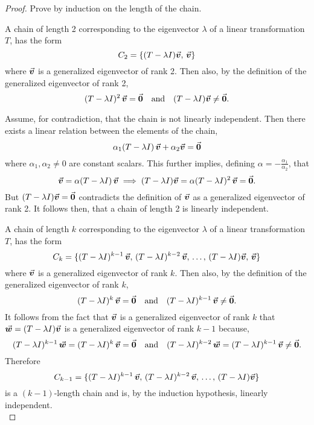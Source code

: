 \documentclass[../MathsNotesBase.tex]{subfiles}
\begin{document}
{		\biggerskip
		\begin{proof}
			Prove by induction on the length of the chain. 
			
			A chain of length 2 corresponding to the eigenvector $\lambda$ of a linear transformation $T$, has the form
			\[ C_2 = \{ (T - \lambda I) \vec{\bm{v}}, \, \vec{\bm{v}} \} \]
			where $\vec{\bm{v}}$ is a generalized eigenvector of rank 2. Then also, by the definition of the generalized eigenvector of rank 2,
			\[ (T - \lambda I)^2 \, \vec{\bm{v}} = \vec{\bm{0}} \hspace{10pt}\text{and}\hspace{10pt} (T - \lambda I) \vec{\bm{v}} \neq \vec{\bm{0}}. \]
			
			Assume, for contradiction, that the chain is not linearly independent. Then there exists a linear relation between the elements of the chain,
			\[ \alpha_1 (T - \lambda I) \, \vec{\bm{v}} + \alpha_2 \vec{\bm{v}} = \vec{\bm{0}} \]
			where ${ \alpha_1, \alpha_2 \neq 0 }$ are constant scalars. This further implies, defining ${ \alpha = -\frac{\alpha_1}{\alpha_2} }$, that
			\[ \vec{\bm{v}} = \alpha (T - \lambda I) \, \vec{\bm{v}} \implies (T - \lambda I) \vec{\bm{v}} = \alpha (T - \lambda I)^2 \, \vec{\bm{v}} = \vec{\bm{0}}. \]
			But ${ (T - \lambda I) \vec{\bm{v}} = \vec{\bm{0}} }$ contradicts the definition of $\vec{\bm{v}}$ as a generalized eigenvector of rank 2. It follows then, that a chain of length 2 is linearly independent.
			
			A chain of length $k$ corresponding to the eigenvector $\lambda$ of a linear transformation $T$, has the form
			\[ C_k = \{ (T - \lambda I)^{k-1} \, \vec{\bm{v}}, \, (T - \lambda I)^{k-2} \, \vec{\bm{v}}, \, \dots, \, (T - \lambda I) \vec{\bm{v}}, \, \vec{\bm{v}} \} \]
			where $\vec{\bm{v}}$ is a generalized eigenvector of rank $k$. Then also, by the definition of the generalized eigenvector of rank $k$,
			\[ (T - \lambda I)^k \, \vec{\bm{v}} = \vec{\bm{0}} \hspace{10pt}\text{and}\hspace{10pt} (T - \lambda I)^{k-1} \, \vec{\bm{v}} \neq \vec{\bm{0}}. \]
			It follows from the fact that $\vec{\bm{v}}$ is a generalized eigenvector of rank $k$ that ${ \vec{\bm{w}} = (T - \lambda I) \vec{\bm{v}} }$ is a generalized eigenvector of rank ${ k - 1 }$ because,
			\[ (T - \lambda I)^{k-1} \, \vec{\bm{w}} = (T - \lambda I)^k \, \vec{\bm{v}} = \vec{\bm{0}} \hspace{10pt}\text{and}\hspace{10pt} (T - \lambda I)^{k-2} \, \vec{\bm{w}} = (T - \lambda I)^{k-1} \, \vec{\bm{v}} \neq \vec{\bm{0}}. \]
			Therefore
			\[ C_{k-1} = \{ (T - \lambda I)^{k-1} \, \vec{\bm{v}}, \, (T - \lambda I)^{k-2} \, \vec{\bm{v}}, \, \dots, \, (T - \lambda I) \vec{\bm{v}} \} \]
			is a $(k-1)$-length chain and is, by the induction hypothesis, linearly independent.\\
			

\end{proof}}
\end{document}

